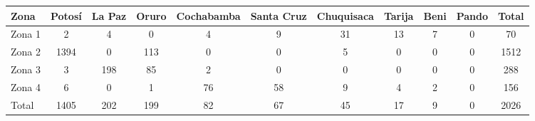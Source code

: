 \begin{tabular}{lcccccccccc}
\toprule
Zona & Potosí & La Paz & Oruro & Cochabamba & Santa Cruz & Chuquisaca & Tarija & Beni & Pando & Total \\
\midrule
Zona 1 & 2 & 4 & 0 & 4 & 9 & 31 & 13 & 7 & 0 & 70 \\
Zona 2 & 1394 & 0 & 113 & 0 & 0 & 5 & 0 & 0 & 0 & 1512 \\
Zona 3 & 3 & 198 & 85 & 2 & 0 & 0 & 0 & 0 & 0 & 288 \\
Zona 4 & 6 & 0 & 1 & 76 & 58 & 9 & 4 & 2 & 0 & 156 \\
Total & 1405 & 202 & 199 & 82 & 67 & 45 & 17 & 9 & 0 & 2026 \\
\bottomrule
\end{tabular}